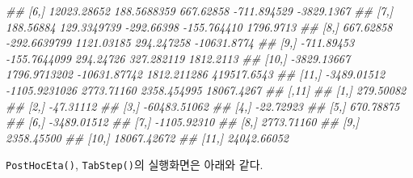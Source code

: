\documentclass[
  11pt,
  krantz2,
  a4paper]{krantz}
\newenvironment{Shaded}{\begin{snugshade}}{\end{snugshade}}
\newcommand{\CommentTok}[1]{\textcolor[rgb]{0.56,0.35,0.01}{\textit{#1}}}
\newcommand{\DataTypeTok}[1]{\textcolor[rgb]{0.13,0.29,0.53}{#1}}
\newcommand{\KeywordTok}[1]{\textcolor[rgb]{0.13,0.29,0.53}{\textbf{#1}}}
\newcommand{\NormalTok}[1]{#1}
\theoremstyle{definition}
\theoremstyle{definition}
\theoremstyle{definition}
\theoremstyle{remark}
\begin{document}
\begin{Shaded}
\begin{Highlighting}[]
\CommentTok{\#\#  [6,] 12023.28652   188.5688359    667.62858  {-}711.894529  {-}3829.1367}
\CommentTok{\#\#  [7,]   188.56884   129.3349739   {-}292.66398  {-}155.764410   1796.9713}
\CommentTok{\#\#  [8,]   667.62858  {-}292.6639799   1121.03185   294.247258 {-}10631.8774}
\CommentTok{\#\#  [9,]  {-}711.89453  {-}155.7644099    294.24726   327.282119   1812.2113}
\CommentTok{\#\# [10,] {-}3829.13667  1796.9713202 {-}10631.87742  1812.211286 419517.6543}
\CommentTok{\#\# [11,] {-}3489.01512 {-}1105.9231026   2773.71160  2358.454995  18067.4267}
\CommentTok{\#\#              [,11]}
\CommentTok{\#\#  [1,]    279.50082}
\CommentTok{\#\#  [2,]    {-}47.31112}
\CommentTok{\#\#  [3,] {-}60483.51062}
\CommentTok{\#\#  [4,]    {-}22.72923}
\CommentTok{\#\#  [5,]    670.78875}
\CommentTok{\#\#  [6,]  {-}3489.01512}
\CommentTok{\#\#  [7,]  {-}1105.92310}
\CommentTok{\#\#  [8,]   2773.71160}
\CommentTok{\#\#  [9,]   2358.45500}
\CommentTok{\#\# [10,]  18067.42672}
\CommentTok{\#\# [11,]  24042.66052}
\end{Highlighting}
\end{Shaded}

\normalsize

\texttt{PostHocEta()}, \texttt{TabStep()}의 실행화면은 아래와 같다.


\begin{Shaded}
\end{Shaded}
\end{document}
